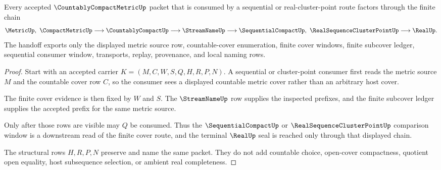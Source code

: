 \begin{theorem}
\label{thm:countably-compact-metric-sequential-window-handoff}
Every accepted $\CountablyCompactMetricUp$ packet that is consumed by a sequential or real-cluster-point route factors through the finite chain
$$
\MetricUp,\ \CompactMetricUp
\longrightarrow
\CountablyCompactUp
\longrightarrow
\StreamNameUp
\longrightarrow
\SequentialCompactUp,\ \RealSequenceClusterPointUp
\longrightarrow
\RealUp .
$$
The handoff exports only the displayed metric source row, countable-cover enumeration, finite cover windows, finite subcover ledger, sequential consumer window, transports, replay, provenance, and local naming rows.
\end{theorem}
\begin{proof}
Start with an accepted carrier $K=(M,C,W,S,Q,H,R,P,N)$. A sequential or cluster-point consumer first reads the metric source $M$ and the countable cover row $C$, so the consumer sees a displayed countable metric cover rather than an arbitrary host cover.

The finite cover evidence is then fixed by $W$ and $S$. The $\StreamNameUp$ row supplies the inspected prefixes, and the finite subcover ledger supplies the accepted prefix for the same metric source.

Only after those rows are visible may $Q$ be consumed. Thus the $\SequentialCompactUp$ or $\RealSequenceClusterPointUp$ comparison window is a downstream read of the finite cover route, and the terminal $\RealUp$ seal is reached only through that displayed chain.

The structural rows $H,R,P,N$ preserve and name the same packet. They do not add countable choice, open-cover compactness, quotient open equality, host subsequence selection, or ambient real completeness.
\end{proof}


